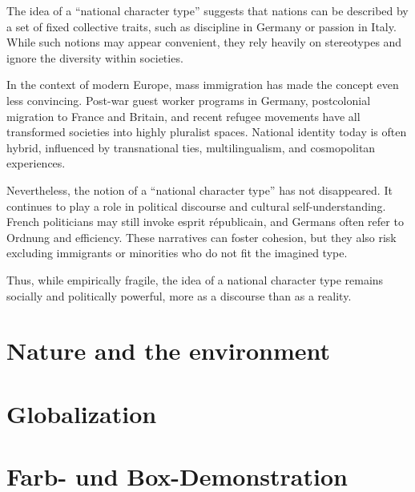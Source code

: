 \documentclass[11pt,a4paper,oneside]{article}
\begin{document}
	The idea of a “national character type” suggests that nations can be described by a set of fixed collective traits, such as discipline in Germany or passion in Italy. While such notions may appear convenient, they rely heavily on stereotypes and ignore the diversity within societies. %
	
	In the context of modern Europe, mass immigration has made the concept even less convincing. Post-war guest worker programs in Germany, postcolonial migration to France and Britain, and recent refugee movements have all transformed societies into highly pluralist spaces. National identity today is often hybrid, influenced by transnational ties, multilingualism, and cosmopolitan experiences. %
	
	Nevertheless, the notion of a “national character type” has not disappeared. It continues to play a role in political discourse and cultural self-understanding. French politicians may still invoke esprit républicain, and Germans often refer to Ordnung and efficiency. These narratives can foster cohesion, but they also risk excluding immigrants or minorities who do not fit the imagined type.
	
	Thus, while empirically fragile, the idea of a national character type remains socially and politically powerful, more as a discourse than as a reality.
	
	\section{Nature and the environment}
	\section{Globalization}
	
	
	\newpage
	
	
	\section{Farb- und Box-Demonstration}
\end{document}

